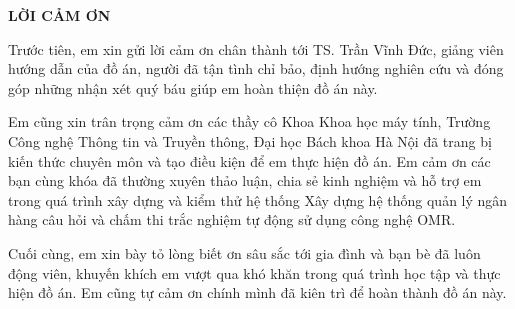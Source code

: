 ﻿\documentclass[../DoAn.tex]{subfiles}
\begin{document}
\begin{center}
    \Large{\textbf{LỜI CẢM ƠN}}\\
\end{center}
\vspace{1cm}

Trước tiên, em xin gửi lời cảm ơn chân thành tới TS. Trần Vĩnh Đức, giảng viên hướng dẫn của đồ án, người đã tận tình chỉ bảo, định hướng nghiên cứu và đóng góp những nhận xét quý báu giúp em hoàn thiện đồ án này.

Em cũng xin trân trọng cảm ơn các thầy cô Khoa Khoa học máy tính, Trường Công nghệ Thông tin và Truyền thông, Đại học Bách khoa Hà Nội đã trang bị kiến thức chuyên môn và tạo điều kiện để em thực hiện đồ án. Em cảm ơn các bạn cùng khóa đã thường xuyên thảo luận, chia sẻ kinh nghiệm và hỗ trợ em trong quá trình xây dựng và kiểm thử hệ thống Xây dựng hệ thống quản lý ngân hàng câu hỏi và chấm thi trắc nghiệm tự động sử dụng công nghệ OMR.

Cuối cùng, em xin bày tỏ lòng biết ơn sâu sắc tới gia đình và bạn bè đã luôn động viên, khuyến khích em vượt qua khó khăn trong quá trình học tập và thực hiện đồ án. Em cũng tự cảm ơn chính mình đã kiên trì để hoàn thành đồ án này.
\end{document}
